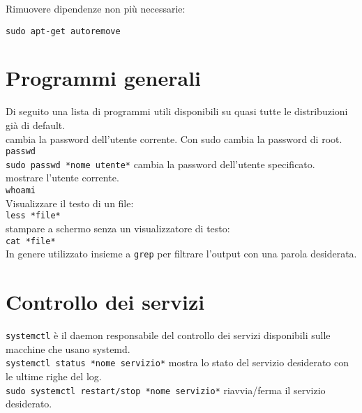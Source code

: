 \documentclass[]{report}
\begin{document}
\noindent Rimuovere dipendenze non più necessarie:

\verb|sudo apt-get autoremove|\\

\noindent 
\newpage

\section{Programmi generali}

Di seguito una lista di programmi utili disponibili su quasi tutte le distribuzioni già di default.\\

\noindent cambia la password dell'utente corrente. Con sudo cambia la password di root.\\

\noindent \verb|passwd| \\

\noindent \verb|sudo passwd *nome utente*| cambia la password dell'utente specificato.\\

\noindent mostrare l'utente corrente.\\
\noindent \verb|whoami| \\

\noindent Visualizzare il testo di un file:\\
\noindent \verb|less *file*|\\

\noindent stampare a schermo senza un visualizzatore di testo:\\
\noindent \verb|cat *file*|\\
In genere utilizzato insieme a \verb|grep| per filtrare l'output con una parola desiderata.



\section{Controllo dei servizi}
\verb|systemctl| è il daemon responsabile del controllo dei servizi disponibili sulle macchine che usano systemd.\\

\noindent \verb|systemctl status *nome servizio*| mostra lo stato del servizio desiderato con le ultime righe del log.\\

\noindent \verb|sudo systemctl restart/stop *nome servizio*| riavvia/ferma il servizio desiderato.\\
\end{document}
